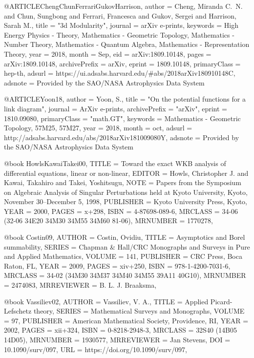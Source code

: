 @ARTICLE{ChengChunFerrariGukovHarrison,
       author = {{Cheng}, Miranda C.~N. and {Chun}, Sungbong and {Ferrari}, Francesca and
        {Gukov}, Sergei and {Harrison}, Sarah M.},
        title = "{3d Modularity}",
      journal = {arXiv e-prints},
     keywords = {High Energy Physics - Theory, Mathematics - Geometric Topology,
        Mathematics - Number Theory, Mathematics - Quantum Algebra,
        Mathematics - Representation Theory},
         year = 2018,
        month = Sep,
          eid = {arXiv:1809.10148},
        pages = {arXiv:1809.10148},
archivePrefix = {arXiv},
       eprint = {1809.10148},
 primaryClass = {hep-th},
       adsurl = {https://ui.adsabs.harvard.edu/#abs/2018arXiv180910148C},
      adsnote = {Provided by the SAO/NASA Astrophysics Data System}
}



@ARTICLE{Yoon18,
   author = {{Yoon}, S.},
    title = "{On the potential functions for a link diagram}",
  journal = {ArXiv e-prints},
archivePrefix = "arXiv",
   eprint = {1810.09080},
 primaryClass = "math.GT",
 keywords = {Mathematics - Geometric Topology, 57M25, 57M27},
     year = 2018,
    month = oct,
   adsurl = {http://adsabs.harvard.edu/abs/2018arXiv181009080Y},
  adsnote = {Provided by the SAO/NASA Astrophysics Data System}
}

@book {HowlsKawaiTakei00,
     TITLE = {Toward the exact {WKB} analysis of differential equations,
              linear or non-linear},
    EDITOR = {Howls, Christopher J. and Kawai, Takahiro and Takei,
              Yoshitsugu},
      NOTE = {Papers from the Symposium on Algebraic Analysis of Singular
              Perturbations held at Kyoto University, Kyoto, November
              30--December 5, 1998},
 PUBLISHER = {Kyoto University Press, Kyoto},
      YEAR = {2000},
     PAGES = {x+298},
      ISBN = {4-87698-089-6},
   MRCLASS = {34-06 (32-06 34E20 34M30 34M55 34M60 81-06)},
  MRNUMBER = {1770278},
}

@book {Costin09,
    AUTHOR = {Costin, Ovidiu},
     TITLE = {Asymptotics and {B}orel summability},
    SERIES = {Chapman \& Hall/CRC Monographs and Surveys in Pure and Applied
              Mathematics},
    VOLUME = {141},
 PUBLISHER = {CRC Press, Boca Raton, FL},
      YEAR = {2009},
     PAGES = {xiv+250},
      ISBN = {978-1-4200-7031-6},
   MRCLASS = {34-02 (34M30 34M37 34M40 34M55 39A11 40G10)},
  MRNUMBER = {2474083},
MRREVIEWER = {B. L. J. Braaksma},
}

@book {Vassiliev02,
    AUTHOR = {Vassiliev, V. A.},
     TITLE = {Applied {P}icard-{L}efschetz theory},
    SERIES = {Mathematical Surveys and Monographs},
    VOLUME = {97},
 PUBLISHER = {American Mathematical Society, Providence, RI},
      YEAR = {2002},
     PAGES = {xii+324},
      ISBN = {0-8218-2948-3},
   MRCLASS = {32S40 (14B05 14D05)},
  MRNUMBER = {1930577},
MRREVIEWER = {Jan Stevens},
       DOI = {10.1090/surv/097},
       URL = {https://doi.org/10.1090/surv/097},
}

